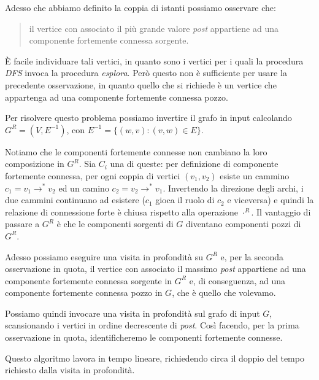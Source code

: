 Adesso che abbiamo definito la coppia di istanti possiamo osservare
che: 
\begin{quotation}
  il vertice con associato il pi\`u grande valore \emph{post}
  appartiene ad una componente fortemente connessa sorgente.
\end{quotation}

\`E facile individuare tali vertici, in quanto sono i vertici per i
quali la procedura \emph{DFS} invoca la procedura
\emph{esplora}. Per\`o questo non \`e sufficiente per usare la
precedente osservazione, in quanto quello che si richiede \`e un
vertice che appartenga ad una componente fortemente connessa pozzo.

Per risolvere questo problema possiamo invertire il grafo in input
calcolando $G^{R} = (V, E^{-1})$, con $E^{-1} = \{(w, v): (v, w) \in
E\}$.

Notiamo che le componenti fortemente connesse non cambiano la loro
composizione in $G^{R}$. Sia $C_{i}$ una di queste: per definizione di
componente fortemente connessa, per ogni coppia di vertici $(v_{1},
v_{2})$ esiste un cammino $c_{1} = v_{1}\rightarrow^{*} v_{2}$ ed un
camino $c_{2} = v_{2}\rightarrow^{*} v_{1}$. Invertendo la direzione
degli archi, i due cammini continuano ad esistere ($c_{1}$ gioca il
ruolo di $c_{2}$ e viceversa) e quindi la relazione di connessione
forte \`e chiusa rispetto alla operazione $\cdot ^{R}$. Il vantaggio
di passare a $G^{R}$ \`e che le componenti sorgenti di $G$ diventano
componenti pozzi di $G^{R}$.

Adesso possiamo eseguire una visita in profondit\`a su $G^{R}$
e, per la seconda osservazione in quota, il vertice con associato il
massimo \emph{post} appartiene ad una componente fortemente connessa
sorgente in $G^{R}$ e, di conseguenza, ad una componente fortemente
connessa pozzo in $G$, che \`e quello che volevamo.

Possiamo quindi invocare una visita in profondit\`a sul grafo di input
$G$, scansionando i vertici in ordine decrescente di
\emph{post}. Cos\`i facendo, per la prima osservazione in quota,
identificheremo le componenti fortemente connesse.

Questo algoritmo lavora in tempo lineare, richiedendo circa il doppio
del tempo richiesto dalla visita in profondit\`a.

